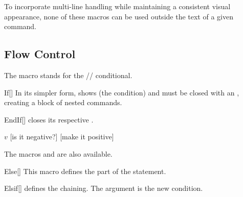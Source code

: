 \documentclass[a4paper, 11pt]{article}
\begin{document}
To incorporate multi-line handling while maintaining a consistent visual appearance, none of these macros can be used outside the text of a given command.

\begin{tcblisting}{}
    \begin{algorithmic}
        \EndIf
    \end{algorithmic}
\end{tcblisting}

\subsection{Flow Control}
The macro  stands for the // conditional.

\begin{macro}{If}[]
    In its simpler form,  shows  (the condition) and must be closed with an , creating a block of nested commands.

    \BlockOptions
\end{macro}

\begin{macro}{EndIf}[]
     closes its respective .

    \StatementOptions
\end{macro}

\begin{tcblisting}{}
    \begin{algorithmic}
        \State \Read $v$
        [is it negative?]
            [make it positive]
        \EndIf
    \end{algorithmic}
\end{tcblisting}

The macros  and  are also available.

\begin{macro}{Else}[]
    This macro defines the  part of the  statement.

    \BlockOptions
\end{macro}

\begin{macro}{Elsif}[]
     defines the  chaining. The argument  is the new condition.

    \BlockOptions
\end{macro}
\end{document}

